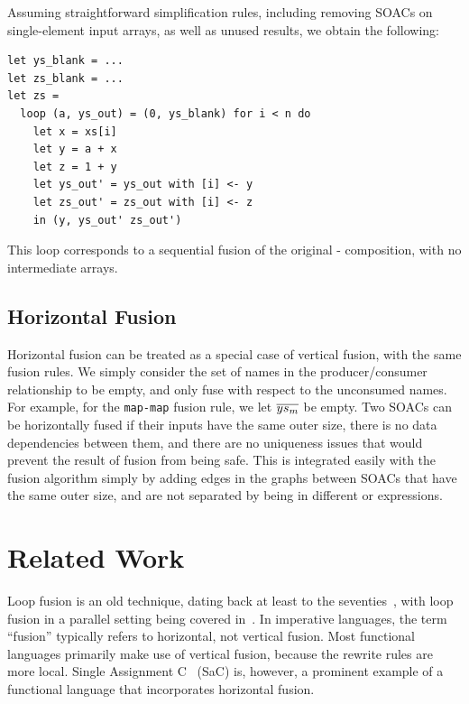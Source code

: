 Assuming straightforward simplification rules, including removing
SOACs on single-element input arrays, as well as unused 
results, we obtain the following:

\begin{lstlisting}
let ys_blank = ...
let zs_blank = ...
let zs =
  loop (a, ys_out) = (0, ys_blank) for i < n do
    let x = xs[i]
    let y = a + x
    let z = 1 + y
    let ys_out' = ys_out with [i] <- y
    let zs_out' = zs_out with [i] <- z
    in (y, ys_out' zs_out')
\end{lstlisting}

This loop corresponds to a sequential fusion of the original
- composition, with no intermediate arrays.

\subsection{Horizontal Fusion}

Horizontal fusion can be treated as a special case of vertical fusion,
with the same fusion rules.  We simply consider the set of names in
the producer/consumer relationship to be empty, and only fuse with
respect to the unconsumed names.  For example, for the
\lstinline{map-map} fusion rule, we let $\overline{ys_{m}}$ be empty.  Two
SOACs can be horizontally fused if their inputs have the same outer
size, there is no data dependencies between them, and there are no
uniqueness issues that would prevent the result of fusion from being
safe.  This is integrated easily with the fusion algorithm simply by
adding edges in the graphs between SOACs that have the same outer
size, and are not separated by being in different  or 
expressions.

\section{Related Work}
\label{sec:related-work-fusion}

Loop fusion is an old technique, dating back at least to the
seventies~\cite{cheatham1977programming}, with loop fusion in a
parallel setting being covered in~\cite{midki1990issues}. In
imperative languages, the term ``fusion'' typically refers to
horizontal, not vertical fusion.  Most functional languages primarily
make use of vertical fusion, because the rewrite rules are more local.
Single Assignment C~\cite{grelck2006sac} (SaC) is, however, a
prominent example of a functional language that incorporates
horizontal fusion.

